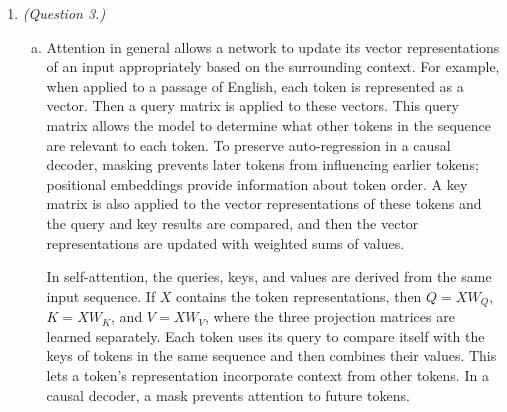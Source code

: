 \documentclass[12pt]{article}
\begin{document}
\begin{enumerate}
    A2C had the best training performance in this experiment. It had the
    highest whole-run average reward and the highest final-100-episode
    average, with less variation across seeds than the other methods in
    that final window. However, REINFORCE had the best post-training
    evaluation performance: every evaluation episode reached the maximum
    reward of 500. A2C was close behind at 493.4, while DQN was substantially
    lower at 152.1. Thus A2C performed best by the training metric, while
    REINFORCE produced the best final evaluation results. These conclusions
    apply to this episode budget, these seeds, and the supplied
    hyperparameters; they do not establish that one algorithm is always
    better. Evaluation also differs from training because dropout and
    DQN's exploratory actions are disabled.

    \noindent\textit{AI-use disclosure for Question 2:}
    I used OpenAI's Codex assistant to prepare and adapt the supplied code
    into a Jupyter notebook and to summarize the saved results in LaTeX.
    I ran the training experiments locally.


    \item \emph{(Question 3.)}
    \begin{enumerate}[a)]
        \item Attention in general allows a network to update its vector representations of an input appropriately based on the surrounding context. For example, when applied to a passage of English, each token is represented as a vector. Then a query matrix is applied to these vectors. This query matrix allows the model to determine what other tokens in the sequence are relevant to each token. To preserve auto-regression in a causal decoder, masking prevents later tokens from influencing earlier tokens; positional embeddings provide information about token order. A key matrix is also applied to the vector representations of these tokens and the query and key results are compared, and then the vector representations are updated with weighted sums of values.

        In self-attention, the queries, keys, and values are derived
        from the same input sequence. If $X$ contains the token representations,
        then $Q=XW_Q$, $K=XW_K$, and $V=XW_V$, where the three projection
        matrices are learned separately. Each token uses its query to compare
        itself with the keys of tokens in the same sequence and then combines
        their values. This lets a token's representation incorporate context
        from other tokens. In a causal decoder, a mask prevents attention to
        future tokens.


\end{enumerate}
\end{enumerate}
\end{document}
